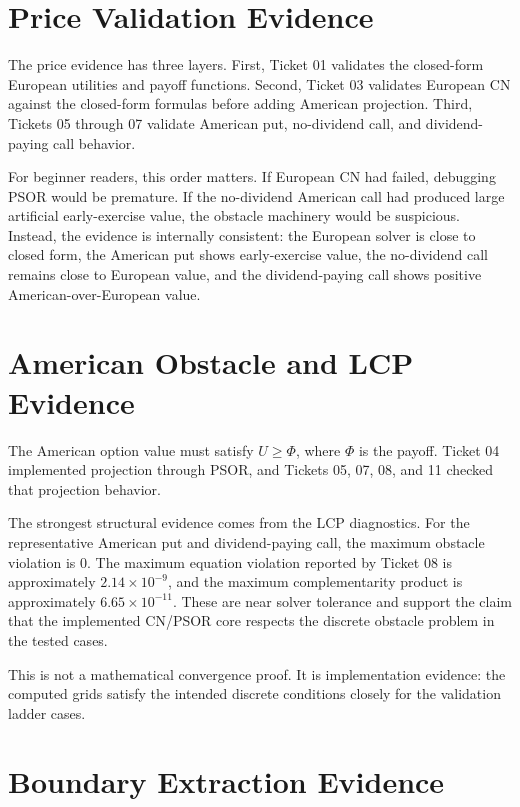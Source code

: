 \documentclass[11pt,a4paper]{article}
\begin{document}
\section{Price Validation Evidence}

The price evidence has three layers. First, Ticket 01 validates the closed-form European utilities and payoff functions. Second, Ticket 03 validates European CN against the closed-form formulas before adding American projection. Third, Tickets 05 through 07 validate American put, no-dividend call, and dividend-paying call behavior.

For beginner readers, this order matters. If European CN had failed, debugging PSOR would be premature. If the no-dividend American call had produced large artificial early-exercise value, the obstacle machinery would be suspicious. Instead, the evidence is internally consistent: the European solver is close to closed form, the American put shows early-exercise value, the no-dividend call remains close to European value, and the dividend-paying call shows positive American-over-European value.

\section{American Obstacle and LCP Evidence}

The American option value must satisfy \(U \geq \Phi\), where \(\Phi\) is the payoff. Ticket 04 implemented projection through PSOR, and Tickets 05, 07, 08, and 11 checked that projection behavior.

The strongest structural evidence comes from the LCP diagnostics. For the representative American put and dividend-paying call, the maximum obstacle violation is \(0\). The maximum equation violation reported by Ticket 08 is approximately \(2.14\times10^{-9}\), and the maximum complementarity product is approximately \(6.65\times10^{-11}\). These are near solver tolerance and support the claim that the implemented CN/PSOR core respects the discrete obstacle problem in the tested cases.

This is not a mathematical convergence proof. It is implementation evidence: the computed grids satisfy the intended discrete conditions closely for the validation ladder cases.

\section{Boundary Extraction Evidence}
\end{document}
